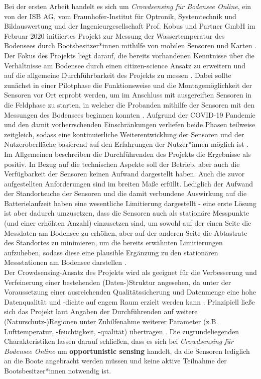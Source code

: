Bei der ersten Arbeit handelt es sich um \textit{Crowdsensing für Bodensee Online}, ein von der ISB AG, vom Fraunhofer-Institut für Optronik, Systemtechnik und Bildauswertung und der Ingenieurgesellschaft Prof. Kobus und Partner GmbH im Februar 2020 initiiertes Projekt zur Messung der Wassertemperatur des Bodensees durch Bootsbesitzer*innen mithilfe von mobilen Sensoren und Karten \cite {Ministerium2021}. Der Fokus des Projekts liegt darauf, die bereits vorhandenen Kenntnisse über die Verhältnisse am Bodensee durch einen citizen-science Ansatz zu erweitern und auf die allgemeine Durchführbarkeit des Projekts zu messen \cite{Bodensee2021}. Dabei sollte zunächst in einer Pilotphase die Funktionsweise und die Montagemöglichkeit der Sensoren vor Ort erprobt werden, um im Anschluss mit ausgereiften Sensoren in die Feldphase zu starten, in welcher die Probanden mithilfe der Sensoren mit den Messungen des Bodensees beginnen konnten \cite{Bodensee2021}. Aufgrund der COVID-19 Pandemie und den damit vorherrschenden Einschränkungen verliefen beide Phasen teilweise zeitgleich, sodass eine kontinuierliche Weiterentwicklung der Sensoren und der Nutzeroberfläche basierend auf den Erfahrungen der Nutzer*innen möglich ist \cite{Bodensee2021}. Im Allgemeinen beschreiben die Durchführenden des Projekts die Ergebnisse als positiv. \newline In Bezug auf die technischen Aspekte soll der Betrieb, aber auch die Verfügbarkeit der Sensoren keinen Aufwand dargestellt haben. Auch die zuvor aufgestellten Anforderungen sind im breiten Maße erfüllt. Lediglich der Aufwand der Standortsuche der Sensoren und die damit verbundene Auswirkung auf die Batterielaufzeit haben eine wesentliche Limitierung dargestellt - eine erste Lösung ist aber dadurch umzusetzen, dass die Sensoren auch als stationäre Messpunkte (und einer erhöhten Anzahl) einzusetzen sind, um sowohl auf der einen Seite die Messdaten am Bodensee zu erhöhen, aber auf der anderen Seite die Abtastrate des Standortes zu minimieren, um die bereits erwähnten Limitierungen aufzuheben, sodass diese eine plausible Ergänzung zu den stationären Messstationen am Bodensee darstellen \cite{Bodensee2021}. \\ Der Crowdsensing-Ansatz des Projekts wird als geeignet für die Verbesserung und Verfeinerung einer bestehenden (Daten-)Struktur angesehen, da unter der Voraussetzung einer ausreichenden Qualitätssicherung und Datenmenge eine hohe Datenqualität und -dichte auf engem Raum erzielt werden kann \cite{Bodensee2021}. Prinzipiell ließe sich das Projekt laut Angaben der Durchführenden auf weitere (Naturschutz-)Regionen unter Zuhilfenahme weiterer Parameter (z.B. Lufttemperatur, -feuchtigkeit, -qualität) übertragen \cite{Bodensee2021}. Die zugrundeliegenden Charakteristiken lassen darauf schließen, dass es sich bei \textit{Crowdsensing für Bodensee Online} um \textbf{opportunistic sensing} handelt, da die Sensoren lediglich an die Boote angebracht werden müssen und keine aktive Teilnahme der Bootsbesitzer*innen notwendig ist.

